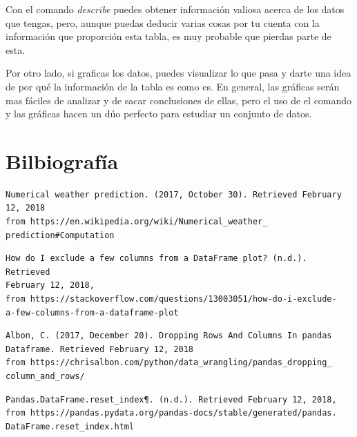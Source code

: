 \documentclass{article}
\begin{document}
Con el comando \textit{describe} puedes obtener información valiosa acerca de los datos que tengas, pero, aunque puedas deducir varias cosas por tu cuenta con la información que proporción esta tabla, es muy probable que pierdas parte de esta.

\vspace{0.3cm}

Por otro lado, si graficas los datos, puedes visualizar lo que pasa y darte una idea de por qué la información de la tabla es como es. En general, las gráficas serán mas fáciles de analizar y de sacar conclusiones de ellas, pero el uso de el comando y las gráficas hacen un dúo perfecto para estudiar un conjunto de datos.


\section{Bilbiografía}

\begin{verbatim}
Numerical weather prediction. (2017, October 30). Retrieved February 
12, 2018 
from https://en.wikipedia.org/wiki/Numerical_weather_
prediction#Computation 
\end{verbatim}

\begin{verbatim}
How do I exclude a few columns from a DataFrame plot? (n.d.). Retrieved
February 12, 2018, 
from https://stackoverflow.com/questions/13003051/how-do-i-exclude-
a-few-columns-from-a-dataframe-plot
\end{verbatim}

\begin{verbatim}
Albon, C. (2017, December 20). Dropping Rows And Columns In pandas 
Dataframe. Retrieved February 12, 2018
from https://chrisalbon.com/python/data_wrangling/pandas_dropping_
column_and_rows/ 
\end{verbatim}

\begin{verbatim}
Pandas.DataFrame.reset_index¶. (n.d.). Retrieved February 12, 2018, 
from https://pandas.pydata.org/pandas-docs/stable/generated/pandas.
DataFrame.reset_index.html 
\end{verbatim}
\end{document}
